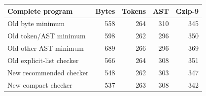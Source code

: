 \begin{center}\small
\begin{tabular}{lrrrr}
\toprule
Complete program & Bytes & Tokens & AST & Gzip-9\\
\midrule
Old byte minimum & 558 & 264 & 310 & 345\\
Old token/AST minimum & 598 & 262 & 296 & 350\\
Old other AST minimum & 689 & 266 & 296 & 369\\
Old explicit-list checker & 566 & 264 & 308 & 351\\
New recommended checker & 548 & 262 & 303 & 347\\
New compact checker & 537 & 263 & 308 & 342\\
\bottomrule
\end{tabular}
\end{center}
